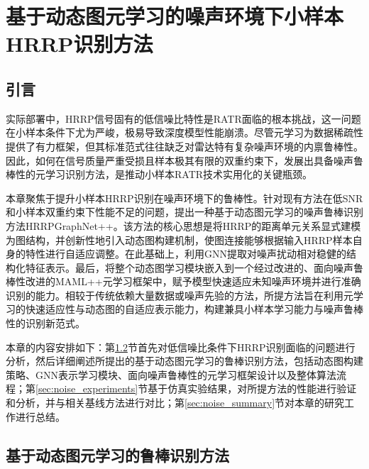 \chapter[基于动态图元学习的噪声环境下小样本HRRP识别方法]{基于动态图元学习的噪声环境下小样本HRRP识别方法}
\label{chap:noise_robust}

\section{引言}
\label{sec:noise_intro}

实际部署中，HRRP信号固有的低信噪比特性是RATR面临的根本挑战，这一问题在小样本条件下尤为严峻，极易导致深度模型性能崩溃。尽管元学习为数据稀疏性提供了有力框架，但其标准范式往往缺乏对雷达特有复杂噪声环境的内禀鲁棒性。因此，如何在信号质量严重受损且样本极其有限的双重约束下，发展出具备噪声鲁棒性的元学习识别方法，是推动小样本RATR技术实用化的关键瓶颈。

本章聚焦于提升小样本HRRP识别在噪声环境下的鲁棒性。针对现有方法在低SNR和小样本双重约束下性能不足的问题，提出一种基于动态图元学习的噪声鲁棒识别方法HRRPGraphNet++。该方法的核心思想是将HRRP的距离单元关系显式建模为图结构，并创新性地引入动态图构建机制，使图连接能够根据输入HRRP样本自身的特性进行自适应调整。在此基础上，利用GNN提取对噪声扰动相对稳健的结构化特征表示。最后，将整个动态图学习模块嵌入到一个经过改进的、面向噪声鲁棒性改进的MAML++元学习框架中，赋予模型快速适应未知噪声环境并进行准确识别的能力。相较于传统依赖大量数据或噪声先验的方法，所提方法旨在利用元学习的快速适应性与动态图的自适应表示能力，构建兼具小样本学习能力与噪声鲁棒性的识别新范式。

本章的内容安排如下：第\ref{sec:noise_methodology}节首先对低信噪比条件下HRRP识别面临的问题进行分析，然后详细阐述所提出的基于动态图元学习的鲁棒识别方法，包括动态图构建策略、GNN表示学习模块、面向噪声鲁棒性的元学习框架设计以及整体算法流程；第\ref{sec:noise_experiments}节基于仿真实验结果，对所提方法的性能进行验证和分析，并与相关基线方法进行对比；第\ref{sec:noise_summary}节对本章的研究工作进行总结。

\section{基于动态图元学习的鲁棒识别方法}
\label{sec:noise_methodology}

